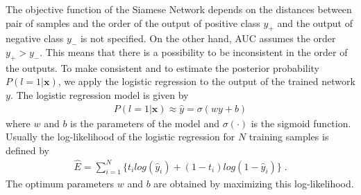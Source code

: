 \documentclass[runningheads,a4paper]{llncs}
\begin{document}


The objective function of the Siamese Network depends on the distances between pair of samples and the order of the output of positive class $y_+$ and the output of negative class $y_-$ is not specified.
On the other hand, AUC assumes the order $y_+ > y_-$.
This means that there is a possibility to be inconsistent in the order of the outputs.
To make consistent and to estimate the posterior probability $P(l=1|\bm{x})$, we apply the logistic regression to the output of the trained network $y$. 
The logistic regression model is given by
\begin{align} \label{eq:regression}
    P(l=1|\bm{x}) \approx \hat{y} = \sigma(w y+b)
\end{align}
where $w$ and $b$ is the parameters of the model and $\sigma(\cdot)$ is the sigmoid function.
Usually the log-likelihood of the logistic regression for $N$ training samples is defined by
\begin{align} \label{eq:crossentropy}
    \hat{E} = \sum_{i=1}^N \{ t_i log(\hat{y}_i) + (1-t_i) log(1-\hat{y}_i) \} \; .
\end{align}
The optimum parameters $w$ and $b$ are obtained by maximizing this log-likelihood.

\end{document}
